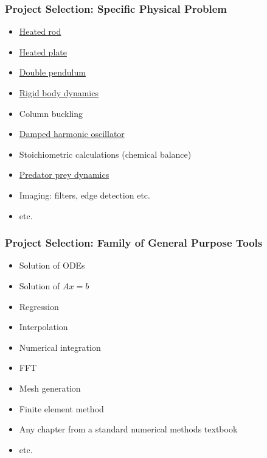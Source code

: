 \documentclass[t,12pt,numbers,fleqn]{beamer}
\begin{document}
\begin{frame}
\frametitle{Project Selection: Specific Physical Problem}
\begin{itemize}
\item
  \href{https://ocw.mit.edu/courses/mathematics/18-303-linear-partial-differential-equations-fall-2006/lecture-notes/heateqni.pdf}{
    Heated
    rod}
\item \href{http://www.tech.plym.ac.uk/sme/THER204B-web/Heatran2.PDF}{Heated plate}
\item \href{https://en.wikipedia.org/wiki/Double_pendulum}{Double pendulum}
\item \href{http://chrishecker.com/Rigid_Body_Dynamics}{Rigid body dynamics}
\item Column buckling
\item \href{https://en.wikipedia.org/wiki/Harmonic_oscillator}{Damped harmonic oscillator}
\item Stoichiometric calculations (chemical balance)
\item
  \href{http://www.tiem.utk.edu/~gross/bioed/bealsmodules/predator-prey.html}{Predator
    prey dynamics}
\item Imaging: filters, edge detection etc.
\item etc.
\end{itemize}

\end{frame}


\begin{frame}
\frametitle{Project Selection: Family of General Purpose Tools}
\begin{itemize}
\item Solution of ODEs
\item Solution of $A x = b$
\item Regression
\item Interpolation
\item Numerical integration
\item FFT
\item Mesh generation
\item Finite element method
\item Any chapter from a standard numerical methods textbook
\item etc.
\end{itemize}
\end{frame}

\end{document}
